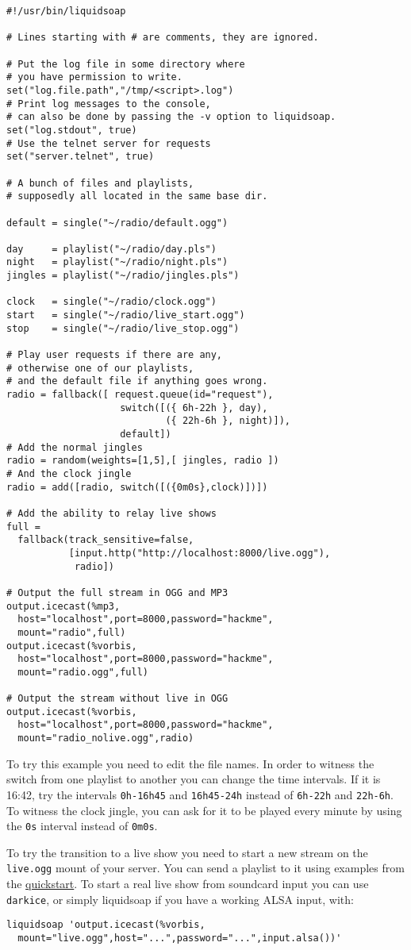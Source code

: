 \begin{verbatim}
#!/usr/bin/liquidsoap

# Lines starting with # are comments, they are ignored.

# Put the log file in some directory where
# you have permission to write.
set("log.file.path","/tmp/<script>.log")
# Print log messages to the console,
# can also be done by passing the -v option to liquidsoap.
set("log.stdout", true)
# Use the telnet server for requests
set("server.telnet", true)

# A bunch of files and playlists,
# supposedly all located in the same base dir.

default = single("~/radio/default.ogg")

day     = playlist("~/radio/day.pls")
night   = playlist("~/radio/night.pls")
jingles = playlist("~/radio/jingles.pls")

clock   = single("~/radio/clock.ogg")
start   = single("~/radio/live_start.ogg")
stop    = single("~/radio/live_stop.ogg")

# Play user requests if there are any,
# otherwise one of our playlists,
# and the default file if anything goes wrong.
radio = fallback([ request.queue(id="request"),
	                switch([({ 6h-22h }, day),
	                        ({ 22h-6h }, night)]),
	                default])
# Add the normal jingles
radio = random(weights=[1,5],[ jingles, radio ])
# And the clock jingle
radio = add([radio, switch([({0m0s},clock)])])

# Add the ability to relay live shows
full =
  fallback(track_sensitive=false,
           [input.http("http://localhost:8000/live.ogg"),
            radio])

# Output the full stream in OGG and MP3
output.icecast(%mp3, 
  host="localhost",port=8000,password="hackme",
  mount="radio",full)
output.icecast(%vorbis, 
  host="localhost",port=8000,password="hackme",
  mount="radio.ogg",full)

# Output the stream without live in OGG
output.icecast(%vorbis, 
  host="localhost",port=8000,password="hackme",
  mount="radio_nolive.ogg",radio)
\end{verbatim}
To try this example you need to edit the file names. In order to witness the switch from one playlist to another you can change the time intervals. If it is 16:42, try the intervals \verb+0h-16h45+ and \verb+16h45-24h+ instead of \verb+6h-22h+ and \verb+22h-6h+. To witness the clock jingle, you can ask for it to be played every minute by using the \verb+0s+ interval instead of \verb+0m0s+.

To try the transition to a live show you need to start a new stream on the \verb+live.ogg+ mount of your server. You can send a playlist to it using examples from the \href{quick_start.html}{quickstart}. To start a real live show from soundcard input you can use \verb+darkice+, or simply liquidsoap if you have a working ALSA input, with:

\begin{verbatim}
liquidsoap 'output.icecast(%vorbis, 
  mount="live.ogg",host="...",password="...",input.alsa())'
\end{verbatim}
